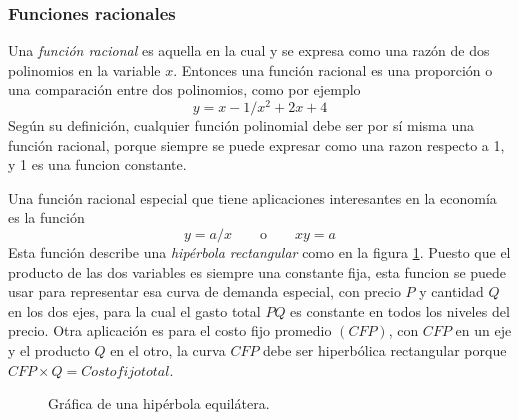 \subsubsection{Funciones racionales}

Una \textit{función racional} es aquella en la cual y se expresa como una razón de dos polinomios en la variable \(x\). Entonces una función racional es una proporción o una comparación entre dos polinomios, como por ejemplo
\[
y=x-1/x^2+2x+4
\]
Según su definición, cualquier función polinomial debe ser por sí misma una función racional, porque siempre se puede expresar como una razon respecto a 1, y 1 es una funcion constante.

Una función racional especial que tiene aplicaciones interesantes en la economía es la función
\[
y=a/x \qquad \text{o} \qquad xy=a
\]
Esta función describe una \textit{hipérbola rectangular} como en la figura \ref{type_funcion_racional}. Puesto que el producto de las dos variables es siempre una constante fija, esta funcion se puede usar para representar esa curva de demanda especial, con precio \(P\) y cantidad \(Q\) en los dos ejes, para la cual el gasto total \(PQ\) es constante en todos los niveles del precio. Otra aplicación es para el costo fijo promedio \((CFP)\), con \(CFP\) en un eje y el producto \(Q\) en el otro, la curva \(CFP\) debe ser hiperbólica rectangular porque \(CFP \times Q = Costo fijo total\).

\begin{figure}[htbp]
    \centering
    \caption{Gráfica de una hipérbola equilátera.}
    \label{type_funcion_racional}
\end{figure}

